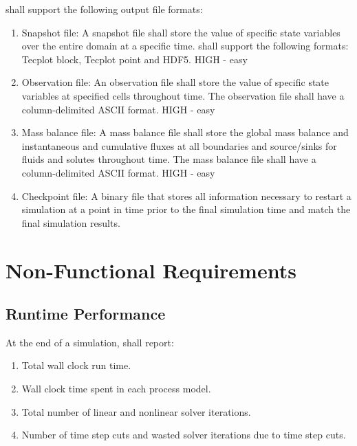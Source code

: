 \noindent\pft shall support the following output file formats: 
\begin{enumerate}[resume]
	\item Snapshot file: \label{outSnapshot} A snapshot file shall store the value of specific state variables over the entire domain at a specific time. \pft shall support the following formats: Tecplot block, Tecplot point and HDF5. HIGH - easy
	\item Observation file: \label{outObservation} An observation file shall store the value of specific state variables at specified cells throughout time. The observation file shall have a column-delimited ASCII format. HIGH - easy
	\item Mass balance file: \label{outMassBalance} A mass balance file shall store the global mass balance and instantaneous and cumulative fluxes at all boundaries and source/sinks for fluids and solutes throughout time. The mass balance file shall have a column-delimited ASCII format. HIGH - easy
	\item Checkpoint file: \label{outCheckpoint} A binary file that stores all information necessary to restart a simulation at a point in time prior to the final simulation time and match the final simulation results.
\end{enumerate}

\section{Non-Functional Requirements}
\subsection{Runtime Performance}
\noindent At the end of a simulation, \pft shall report:
\begin{enumerate}
	\item Total wall clock run time.
	\item Wall clock time spent in each process model.
	\item Total number of linear and nonlinear solver iterations.
	\item Number of time step cuts and wasted solver iterations due to time step cuts.
\end{enumerate}


